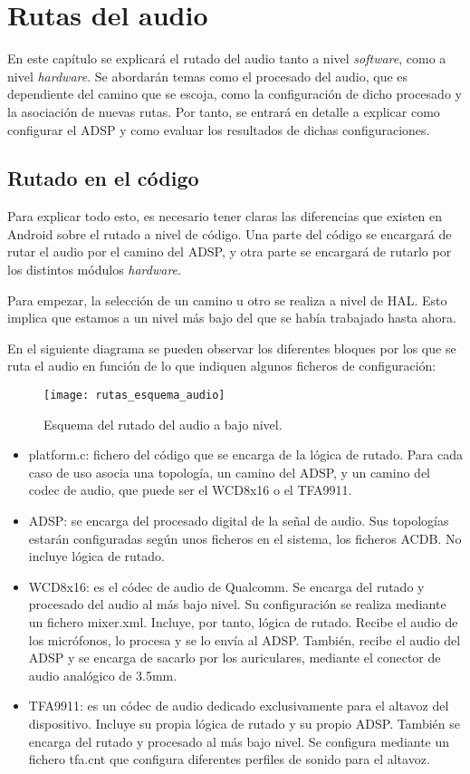 \chapter{Rutas del audio}\label{chap:rutas_audio}
En este capítulo se explicará el rutado del audio tanto a nivel \textit{software}, como a nivel \textit{hardware}. Se abordarán temas como el procesado del audio, que es dependiente del camino que se escoja, como la configuración de dicho procesado y la asociación de nuevas rutas. Por tanto, se entrará en detalle a explicar como configurar el \gls{ADSP} y como evaluar los resultados de dichas configuraciones.


\section{Rutado en el código}\label{sec:rutado_codigo}
Para explicar todo esto, es necesario tener claras las diferencias que existen en Android sobre el rutado a nivel de código. Una parte del código se encargará de rutar el audio por el camino del \gls{ADSP}, y otra parte se encargará de rutarlo por los distintos módulos \textit{hardware}.

Para empezar, la selección de un camino u otro se realiza a nivel de \gls{HAL}. Esto implica que estamos a un nivel más bajo del que se había trabajado hasta ahora.

En el siguiente diagrama se pueden observar los diferentes bloques por los que se ruta el audio en función de lo que indiquen algunos ficheros de configuración:

\begin{figure}[H]
	\centering
	\texttt{[image: rutas\_esquema\_audio]}
	\caption{Esquema del rutado del audio a bajo nivel.}
	\label{figrutas_esquema}
\end{figure}

\begin{itemize}
	\item{platform.c: fichero del código que se encarga de la lógica de rutado. Para cada caso de uso asocia una topología, un camino del \gls{ADSP}, y un camino del codec de audio, que puede ser el WCD8x16 o el TFA9911.}
	\item{\gls{ADSP}: se encarga del procesado digital de la señal de audio. Sus topologías estarán configuradas según unos ficheros en el sistema, los ficheros \gls{ACDB}. No incluye lógica de rutado.}
	\item{WCD8x16: es el códec de audio de Qualcomm. Se encarga del rutado y procesado del audio al más bajo nivel. Su configuración se realiza mediante un fichero mixer.xml. Incluye, por tanto, lógica de rutado. Recibe el audio de los micrófonos, lo procesa y se lo envía al \gls{ADSP}. También, recibe el audio del \gls{ADSP} y se encarga de sacarlo por los auriculares, mediante el conector de audio analógico de 3.5mm.}
	\item{TFA9911: es un códec de audio dedicado exclusivamente para el altavoz del dispositivo. Incluye su propia lógica de rutado y su propio \gls{ADSP}. También se encarga del rutado y procesado al más bajo nivel. Se configura mediante un fichero tfa.cnt que configura diferentes perfiles de sonido para el altavoz.}
\end{itemize}

